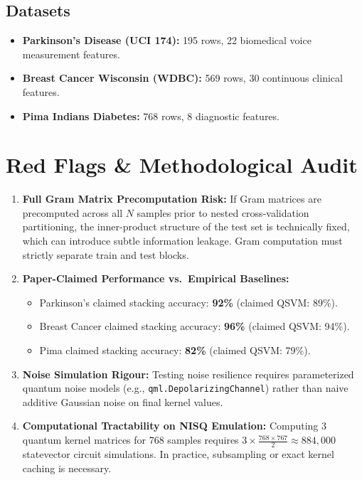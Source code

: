 \documentclass[12pt,a4paper]{article}
\begin{document}
\subsection{Datasets}
\begin{itemize}[leftmargin=*]
  \item \textbf{Parkinson's Disease (UCI 174):} 195 rows, 22 biomedical voice measurement features.
  \item \textbf{Breast Cancer Wisconsin (WDBC):} 569 rows, 30 continuous clinical features.
  \item \textbf{Pima Indians Diabetes:} 768 rows, 8 diagnostic features.
\end{itemize}

\section{Red Flags \& Methodological Audit}
\begin{enumerate}[leftmargin=*]
  \item \textbf{Full Gram Matrix Precomputation Risk:} If Gram matrices are precomputed across all $N$ samples prior to nested cross-validation partitioning, the inner-product structure of the test set is technically fixed, which can introduce subtle information leakage. Gram computation must strictly separate train and test blocks.
  \item \textbf{Paper-Claimed Performance vs.\ Empirical Baselines:}
    \begin{itemize}
      \item Parkinson's claimed stacking accuracy: \textbf{92\%} (claimed QSVM: 89\%).
      \item Breast Cancer claimed stacking accuracy: \textbf{96\%} (claimed QSVM: 94\%).
      \item Pima claimed stacking accuracy: \textbf{82\%} (claimed QSVM: 79\%).
    \end{itemize}
  \item \textbf{Noise Simulation Rigour:} Testing noise resilience requires parameterized quantum noise models (e.g., \texttt{qml.DepolarizingChannel}) rather than naive additive Gaussian noise on final kernel values.
  \item \textbf{Computational Tractability on NISQ Emulation:} Computing 3 quantum kernel matrices for 768 samples requires $3 \times \frac{768 \times 767}{2} \approx 884,000$ statevector circuit simulations. In practice, subsampling or exact kernel caching is necessary.
\end{enumerate}
\end{document}
